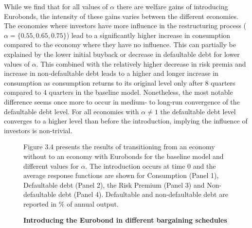 While we find that for all values of $\alpha$ there are welfare gains of introducing Eurobonds, the intensity of these gains varies between the different economies. The economies where investors have more influence in the restructuring process ($\alpha = \{0.55,0.65,0.75\}$) lead to a significantly higher increase in consumption compared to the economy where they have no influence. This can partially be explained by the lower initial buyback or decrease in defaultable debt for lower values of $\alpha$. This combined with the relatively higher decrease in risk premia and increase in non-defaultable debt leads to a higher and longer increase in consumption as consumption returns to its original level only after 8 quarters compared to 4 quarters in the baseline model.  Nonetheless, the most notable difference seems once more to occur in medium- to long-run convergence of the defaultable debt level. For all economies with $\alpha \neq 1$ the defaultable debt level converges to a higher level than before the introduction, implying the influence of investors is non-trivial.\\
 \begin{figure}[H]
\caption{\textbf{Introducing the Eurobond in different bargaining schedules}}
    \centering
    \vspace{1mm}
    \label{fig:intro_comp}
        \begin{tablenotes}
      \footnotesize
   Figure 3.4 presents the results of transitioning from an economy without to an economy with Eurobonds for the baseline model and different values for $\alpha$. The introduction occurs at time 0 and the average response functions are shown for Consumption (Panel 1), Defaultable debt (Panel 2), the Risk Premium (Panel 3) and Non-defaultable debt (Panel 4). Defaultable and non-defaultable debt are reported in \% of annual output.
    \end{tablenotes}
\end{figure}
